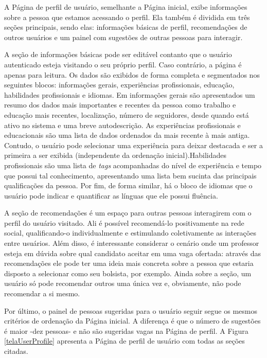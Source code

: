 A Página de perfil de usuário, semelhante a Página inicial, exibe informações sobre a pessoa que estamos acessando o perfil. Ela também é dividida em três seções principais, sendo elas: informações básicas de perfil, recomendações de outros usuários e um painel com sugestões de outras pessoas para interagir.

A seção de informações básicas pode ser editável contanto que o usuário autenticado esteja visitando o seu próprio perfil. Caso contrário, a página é apenas para leitura. Os dados são exibidos de forma completa e segmentados nos seguintes blocos: informações gerais, experiências profissionais, educação, habilidades profissionais e idiomas. Em informações gerais são apresentados um resumo dos dados mais importantes e recentes da pessoa como trabalho e educação mais recentes, localização, número de seguidores, desde quando está ativo no sistema e uma breve autodescrição. As experiências profissionais e educacionais são uma lista de dados ordenados da mais recente à mais antiga. Contudo, o usuário pode selecionar uma experiência para deixar destacada e ser a primeira a ser exibida (independente da ordenação inicial).Habilidades profissionais são uma lista de \textit{tags} acompanhadas do nível de experiência e tempo que possui tal conhecimento, apresentando uma lista bem sucinta das principais qualificações da pessoa. Por fim, de forma similar, há o bloco de idiomas que o usuário pode indicar e quantificar as línguas que ele possui fluência.

A seção de recomendações é um espaço para outras pessoas interagirem com o perfil do usuário visitado. Ali é possível recomendá-lo positivamente na rede social, qualificando-o individualmente e estimulando coletivamente as interações entre usuários. Além disso, é interessante considerar o cenário onde um professor esteja em dúvida sobre qual candidato aceitar em uma vaga ofertada: através das recomendações ele pode ter uma ideia mais concreta sobre a pessoa que estaria disposto a selecionar como seu bolsista, por exemplo. Ainda sobre a seção, um usuário só pode recomendar outros uma única vez e, obviamente, não pode recomendar a si mesmo.

Por último, o painel de pessoas sugeridas para o usuário seguir segue os mesmos critérios de ordenação da Página inicial. A diferença é que o número de sugestões é maior -dez pessoas- e não são sugeridas vagas na Página de perfil. A Figura \ref{telaUserProfile} apresenta a Página de perfil de usuário com todas as seções citadas.

